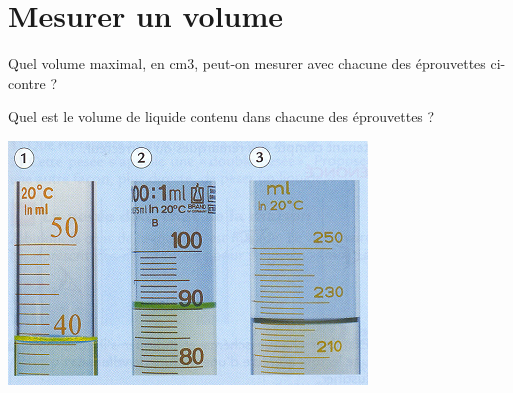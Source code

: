 \section{Mesurer un volume }\label{ex:temperture}


\begin{questions}
	
	\begin{multicols}{2}
		
	
		\question[] Quel volume maximal, en cm3, peut-on mesurer avec chacune des éprouvettes ci-contre ?
		
		\question[]	Quel est le volume de liquide contenu dans chacune des éprouvettes ?
		
		\begin{center}
			
		\includegraphics[scale=0.8]{img/mesure1}
		\end{center}
		
	\end{multicols}
	
\end{questions}